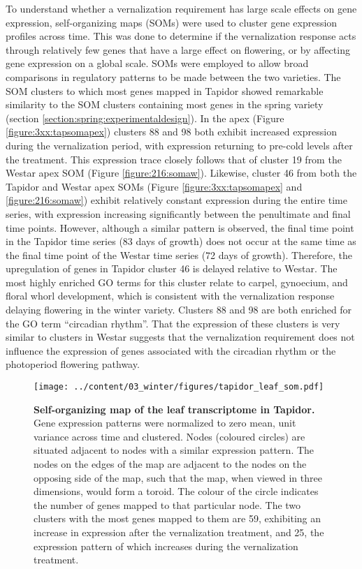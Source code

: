 \documentclass[12pt,]{book}
\begin{document}
To understand whether a vernalization requirement has large scale
effects on gene expression, self-organizing maps (SOMs) were used to
cluster gene expression profiles across time. This was done to determine
if the vernalization response acts through relatively few genes that
have a large effect on flowering, or by affecting gene expression on a
global scale. SOMs were employed to allow broad comparisons in
regulatory patterns to be made between the two varieties. The SOM
clusters to which most genes mapped in Tapidor showed remarkable
similarity to the SOM clusters containing most genes in the spring
variety (section \ref{section:spring:experimentaldesign}). In the apex
(Figure \ref{figure:3xx:tapsomapex}) clusters 88 and 98 both exhibit
increased expression during the vernalization period, with expression
returning to pre-cold levels after the treatment. This expression trace
closely follows that of cluster 19 from the Westar apex SOM (Figure
\ref{figure:216:somaw}). Likewise, cluster 46 from both the Tapidor and
Westar apex SOMs (Figure \ref{figure:3xx:tapsomapex} and
\ref{figure:216:somaw}) exhibit relatively constant expression during
the entire time series, with expression increasing significantly between
the penultimate and final time points. However, although a similar
pattern is observed, the final time point in the Tapidor time series (83
days of growth) does not occur at the same time as the final time point
of the Westar time series (72 days of growth). Therefore, the
upregulation of genes in Tapidor cluster 46 is delayed relative to
Westar. The most highly enriched GO terms for this cluster relate to
carpel, gynoecium, and floral whorl development, which is consistent
with the vernalization response delaying flowering in the winter
variety. Clusters 88 and 98 are both enriched for the GO term
``circadian rhythm''. That the expression of these clusters is very
similar to clusters in Westar suggests that the vernalization
requirement does not influence the expression of genes associated with
the circadian rhythm or the photoperiod flowering pathway.

\begin{figure}[htbp]
\centering
\texttt{[image: ../content/03\_winter/figures/tapidor\_leaf\_som.pdf]}
\caption{\textbf{Self-organizing map of the leaf transcriptome in
Tapidor.} Gene expression patterns were normalized to zero mean, unit
variance across time and clustered. Nodes (coloured circles) are
situated adjacent to nodes with a similar expression pattern. The nodes
on the edges of the map are adjacent to the nodes on the opposing side
of the map, such that the map, when viewed in three dimensions, would
form a toroid. The colour of the circle indicates the number of genes
mapped to that particular node. The two clusters with the most genes
mapped to them are 59, exhibiting an increase in expression after the
vernalization treatment, and 25, the expression pattern of which
increases during the vernalization
treatment.}\label{figure:3xx:tapsomleaf}
\end{figure}
\end{document}
